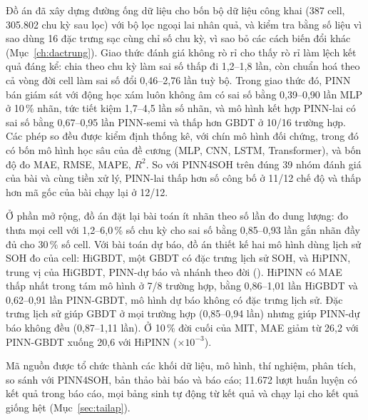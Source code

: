 Đồ án đã xây dựng đường ống dữ liệu cho bốn bộ dữ liệu công khai (387 cell, 305.802 chu kỳ sau lọc) với bộ lọc ngoại lai nhân quả, và kiểm tra bằng số liệu vì sao dùng 16 đặc trưng sạc cùng chỉ số chu kỳ, vì sao bỏ các cách biến đổi khác (Mục~\ref{ch:dactrung}). Giao thức đánh giá không rò rỉ cho thấy rò rỉ làm lệch kết quả đáng kể: chia theo chu kỳ làm sai số thấp đi 1{,}2--1{,}8 lần, còn chuẩn hoá theo cả vòng đời cell làm sai số đổi 0{,}46--2{,}76 lần tuỳ bộ. Trong giao thức đó, PINN bán giám sát với động học xám luôn không âm có sai số bằng 0{,}39--0{,}90 lần MLP ở 10\,\% nhãn, tức tiết kiệm 1{,}7--4{,}5 lần số nhãn, và mô hình kết hợp PINN-lai có sai số bằng 0{,}67--0{,}95 lần PINN-semi và thấp hơn GBDT ở 10/16 trường hợp. Các phép so đều được kiểm định thống kê, với chín mô hình đối chứng, trong đó có bốn mô hình học sâu của đề cương (MLP, CNN, LSTM, Transformer), và bốn độ đo MAE, RMSE, MAPE, $R^2$. So với PINN4SOH trên đúng 39 nhóm đánh giá của bài và cùng tiền xử lý, PINN-lai thấp hơn số công bố ở 11/12 chế độ và thấp hơn mã gốc của bài chạy lại ở 12/12.

Ở phần mở rộng, đồ án đặt lại bài toán ít nhãn theo số lần đo dung lượng: đo thưa mọi cell với 1{,}2--6{,}0\,\% số chu kỳ cho sai số bằng 0{,}85--0{,}93 lần gắn nhãn đầy đủ cho 30\,\% số cell. Với bài toán dự báo, đồ án thiết kế hai mô hình dùng lịch sử SOH đo của cell: HiGBDT, một GBDT có đặc trưng lịch sử SOH, và HiPINN, trung vị của HiGBDT, PINN-dự báo và nhánh theo đời (). HiPINN có MAE thấp nhất trong tám mô hình ở 7/8 trường hợp, bằng 0{,}86--1{,}01 lần HiGBDT và 0{,}62--0{,}91 lần PINN-GBDT, mô hình dự báo không có đặc trưng lịch sử. Đặc trưng lịch sử giúp GBDT ở mọi trường hợp (0{,}85--0{,}94 lần) nhưng giúp PINN-dự báo không đều (0{,}87--1{,}11 lần). Ở 10\,\% đời cuối của MIT, MAE giảm từ 26{,}2 với PINN-GBDT xuống 20{,}6 với HiPINN ($\times10^{-3}$).

Mã nguồn được tổ chức thành các khối dữ liệu, mô hình, thí nghiệm, phân tích, so sánh với PINN4SOH, bản thảo bài báo và báo cáo; 11.672 lượt huấn luyện có kết quả trong báo cáo, mọi bảng sinh tự động từ kết quả và chạy lại cho kết quả giống hệt (Mục~\ref{sec:tailap}).

